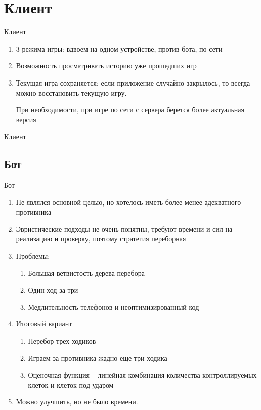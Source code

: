 \documentclass{beamer}
\begin{document}
\section{Клиент}

\begin{frame}[t]{Клиент}
    \begin{enumerate}
    \item
        3 режима игры: вдвоем на одном устройстве, против бота, по сети
    \pause
    \item
        Возможность просматривать историю уже прошедших игр
    \pause
    \item
        Текущая игра сохраняется: если приложение случайно закрылось, то всегда можно восстановить текущую игру.

        При необходимости, при игре по сети с сервера берется более актуальная версия
    \end{enumerate}
\end{frame}

\begin{frame}[t]{Клиент}
\end{frame}
\subsection{Бот}
\begin{frame}[t]{Бот}
    \begin{enumerate}
    \item
        Не являлся основной целью, но хотелось иметь более-менее адекватного противника
    \pause
    \item
        Эвристические подходы не очень понятны, требуют времени и сил на реализацию и проверку, поэтому стратегия переборная

    \pause
    \item
        Проблемы:
        \begin{enumerate}
            \item
                Большая ветвистость дерева перебора
            \item
                Один ход за три
            \item
                Медлительность телефонов и неоптимизированный код         
        \end{enumerate}        
    \pause
    \item
        Итоговый вариант
        \begin{enumerate}
            \item
                Перебор трех ходиков
            \item
                Играем за противника жадно еще три ходика
            \item
                Оценочная функция -- линейная комбинация количества контроллируемых клеток и клеток под ударом
        \end{enumerate}        
    \pause
    \item
        Можно улучшить, но не было времени.
    \end{enumerate}
\end{frame}
\end{document}
